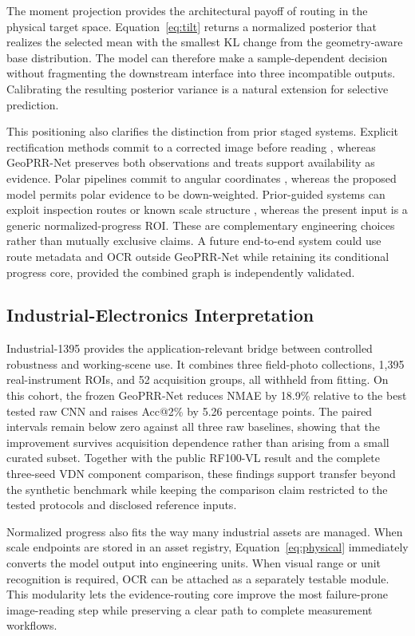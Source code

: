 \documentclass[electronics,article,submit,oneauthor]{Definitions/mdpi}
\newcommand{\modelname}{GeoPRR-Net\xspace}
\begin{document}
The moment projection provides the architectural payoff of routing in the physical target space. Equation~\eqref{eq:tilt} returns a normalized posterior that realizes the selected mean with the smallest KL change from the geometry-aware base distribution. The model can therefore make a sample-dependent decision without fragmenting the downstream interface into three incompatible outputs. Calibrating the resulting posterior variance is a natural extension for selective prediction.

This positioning also clarifies the distinction from prior staged systems. Explicit rectification methods commit to a corrected image before reading \cite{bao2019ipm,tan2024transunet}, whereas \modelname preserves both observations and treats support availability as evidence. Polar pipelines commit to angular coordinates \cite{li2020text,sun2023pointer}, whereas the proposed model permits polar evidence to be down-weighted. Prior-guided systems can exploit inspection routes or known scale structure \cite{chu2025prikmet}, whereas the present input is a generic normalized-progress ROI. These are complementary engineering choices rather than mutually exclusive claims. A future end-to-end system could use route metadata and OCR outside \modelname while retaining its conditional progress core, provided the combined graph is independently validated.

\subsection{Industrial-Electronics Interpretation}

Industrial-1395 provides the application-relevant bridge between controlled robustness and working-scene use. It combines three field-photo collections, 1,395 real-instrument ROIs, and 52 acquisition groups, all withheld from fitting. On this cohort, the frozen \modelname reduces NMAE by 18.9\% relative to the best tested raw CNN and raises Acc@2\% by 5.26 percentage points. The paired intervals remain below zero against all three raw baselines, showing that the improvement survives acquisition dependence rather than arising from a small curated subset. Together with the public RF100-VL result and the complete three-seed VDN component comparison, these findings support transfer beyond the synthetic benchmark while keeping the comparison claim restricted to the tested protocols and disclosed reference inputs.

Normalized progress also fits the way many industrial assets are managed. When scale endpoints are stored in an asset registry, Equation~\eqref{eq:physical} immediately converts the model output into engineering units. When visual range or unit recognition is required, OCR can be attached as a separately testable module. This modularity lets the evidence-routing core improve the most failure-prone image-reading step while preserving a clear path to complete measurement workflows.
\end{document}
